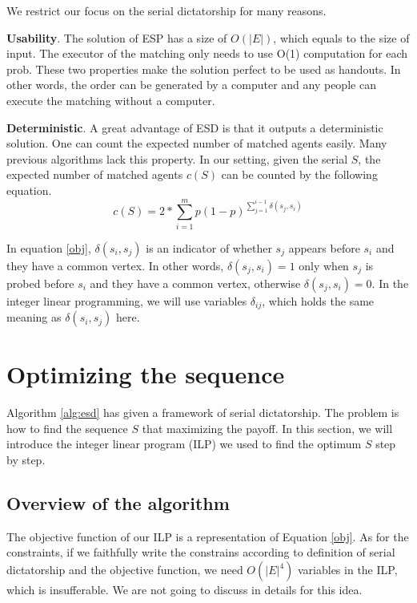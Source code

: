 \documentclass[letterpaper]{article}
\begin{document}
We restrict our focus on the serial dictatorship for many reasons.

\textbf{Usability}. The solution of ESP has a size of $O(|E|)$, which equals to the size of input. The executor of the matching only needs to use O(1) computation for each prob. These two properties make the solution perfect to be used as handouts. In other words, the order can be generated by a computer and any people can execute the matching without a computer.

\textbf{Deterministic}. A great advantage of ESD is that it outputs a deterministic solution. One can count the expected number of matched agents easily. 
Many previous algorithms lack this property.
In our setting, given the serial $S$, the expected number of matched agents $c(S)$ can be counted by the following equation.
\begin{equation}\label{obj}
c(S)=2*\sum_{i=1}^m p(1-p)^{\sum_{j=1}^{i-1}\delta(s_j,s_i)}
\end{equation}

In equation \ref{obj}, $\delta(s_i,s_j)$ is an indicator of whether $s_j$ appears before $s_i$ and they have a common vertex. In other words, $\delta(s_j,s_i)=1$ only when $s_j$ is probed before $s_i$ and they have a common vertex, otherwise  $\delta(s_j,s_i)=0$. 
In the integer linear programming, we will use variables $\delta_{ij}$, which holds the same meaning as $\delta(s_i,s_j)$ here.

\section{Optimizing the sequence}

Algorithm \ref{alg:esd} has given a framework of serial dictatorship. 
The problem is how to find the sequence $S$ that maximizing the payoff.
In this section, we will introduce the integer linear program (ILP) we used to find the optimum $S$ step by step.

\subsection{Overview of the algorithm}

The objective function of our ILP is a representation of Equation \ref{obj}.
As for the constraints, if we faithfully write the constrains according to definition of serial dictatorship and the objective function, we need $O(|E|^4)$ variables in the ILP, which is insufferable. We are not going to discuss in details for this idea.
\end{document}
